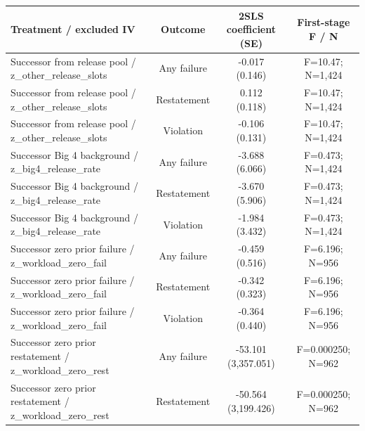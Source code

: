 \documentclass[10pt]{article}
\begin{document}
\begin{minipage}{19cm}\fontsize{10}{12}\selectfont\setlength{\tabcolsep}{4pt}\renewcommand{\arraystretch}{1.12}


\centering
{}
\begin{threeparttable}
\begin{tabular}{p{}ccc}
\toprule
Treatment / excluded IV & Outcome & 2SLS coefficient (SE) & First-stage F / N \\
\midrule
Successor from release pool / z\_other\_release\_slots & Any failure & \shortstack{-0.017\\(0.146)} & F=10.47; N=1,424 \\
Successor from release pool / z\_other\_release\_slots & Restatement & \shortstack{0.112\\(0.118)} & F=10.47; N=1,424 \\
Successor from release pool / z\_other\_release\_slots & Violation & \shortstack{-0.106\\(0.131)} & F=10.47; N=1,424 \\
Successor Big 4 background / z\_big4\_release\_rate & Any failure & \shortstack{-3.688\\(6.066)} & F=0.473; N=1,424 \\
Successor Big 4 background / z\_big4\_release\_rate & Restatement & \shortstack{-3.670\\(5.906)} & F=0.473; N=1,424 \\
Successor Big 4 background / z\_big4\_release\_rate & Violation & \shortstack{-1.984\\(3.432)} & F=0.473; N=1,424 \\
Successor zero prior failure / z\_workload\_zero\_fail & Any failure & \shortstack{-0.459\\(0.516)} & F=6.196; N=956 \\
Successor zero prior failure / z\_workload\_zero\_fail & Restatement & \shortstack{-0.342\\(0.323)} & F=6.196; N=956 \\
Successor zero prior failure / z\_workload\_zero\_fail & Violation & \shortstack{-0.364\\(0.440)} & F=6.196; N=956 \\
Successor zero prior restatement / z\_workload\_zero\_rest & Any failure & -53.101 (3,357.051) & F=0.000250; N=962 \\
Successor zero prior restatement / z\_workload\_zero\_rest & Restatement & -50.564 (3,199.426) & F=0.000250; N=962 \\

\end{tabular}
\end{threeparttable}
\end{minipage}
\end{document}
